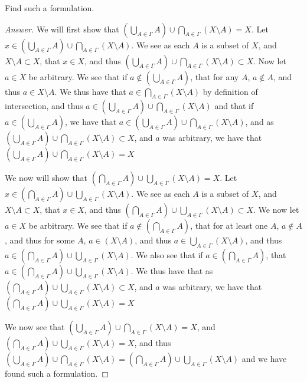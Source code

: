 \begin{minorEx}
    [Riddle]
    Find such a formulation.
\end{minorEx}
\begin{proof}[Answer]
  We will first show that $(\bigcup_{A \in \Gamma} A ) \cup
  \bigcap_{A \in\Gamma}(X \setminus A) = X$.  Let 
  $x \in (\bigcup_{A \in \Gamma} A ) \cup
  \bigcap_{A \in\Gamma}(X \setminus A)$. We see as each $A$ is a
  subset of $X$, and $X\setminus A \subset X$, that $x\in X$, and thus 
  $(\bigcup_{A \in \Gamma} A ) \cup
  \bigcap_{A \in\Gamma}(X \setminus A) \subset X$. Now let $a \in X$
  be arbitrary. We see that if $a \notin (\bigcup_{A \in \Gamma} A )$,
  that for any $A$, $a \notin A$, and thus $a \in X \setminus A$. We
  thus have that $a\in \bigcap_{A \in\Gamma}(X \setminus A)$ by
  definition of intersection, and thus $a\in (\bigcup_{A \in \Gamma} A ) \cup
  \bigcap_{A \in\Gamma}(X \setminus A)$ and that if 
  $a \in (\bigcup_{A \in \Gamma} A )$, we
  have that  $a\in (\bigcup_{A \in \Gamma} A ) \cup \bigcap_{A
    \in\Gamma}(X \setminus A)$, and as 
  $(\bigcup_{A \in \Gamma} A ) \cup \bigcap_{A\in\Gamma}
  (X \setminus A) \subset X$, and $a$ was arbitrary, we have that 
  $(\bigcup_{A \in \Gamma} A ) \cup 
  \bigcap_{A\in\Gamma}(X \setminus A) = X$

  We now will show that $(\bigcap_{A \in \Gamma} A ) \cup
  \bigcup_{A \in\Gamma}(X \setminus A) =X$.
  Let 
  $x \in (\bigcap_{A \in \Gamma} A ) \cup
  \bigcup_{A \in\Gamma}(X \setminus A)$. We see as each $A$ is a
  subset of $X$, and $X\setminus A \subset X$, that $x\in X$, and thus 
  $(\bigcap_{A \in \Gamma} A ) \cup
  \bigcup_{A \in\Gamma}(X \setminus A) \subset X$. We now let $a \in
  X$ be arbitrary. We see that if $a \notin(\bigcap_{A \in \Gamma} A
  )$, that for at least one $A$, $a\notin A$, and thus for some $A$,
  $a \in (X \setminus A)$, and thus $a \in \bigcup_{A \in\Gamma}(X
  \setminus A) $, and thus $a \in (\bigcap_{A \in \Gamma} A ) \cup
  \bigcup_{A \in\Gamma}(X \setminus A)$. We also see that if 
  $a \in(\bigcap_{A \in \Gamma} A)$, that $a \in (\bigcap_{A \in \Gamma} A ) \cup
  \bigcup_{A \in\Gamma}(X \setminus A)$. We thus have that as $(\bigcap_{A \in \Gamma} A ) \cup
  \bigcup_{A \in\Gamma}(X \setminus A) \subset X$, and $a$ was
  arbitrary, we have that 
  $(\bigcap_{A \in \Gamma} A ) \cup \bigcup_{A \in\Gamma}(X \setminus A) = X$

  We now see that $(\bigcup_{A \in \Gamma} A ) \cup
  \bigcap_{A \in\Gamma}(X \setminus A) = X$, and 
  $(\bigcap_{A \in \Gamma} A ) \cup
  \bigcup_{A \in\Gamma}(X \setminus A) =X$, and thus 
  $(\bigcup_{A \in \Gamma} A ) \cup
  \bigcap_{A \in\Gamma}(X \setminus A) =
  (\bigcap_{A \in \Gamma} A ) \cup
  \bigcup_{A \in\Gamma}(X \setminus A)$ and we have found such a formulation.

\end{proof}

